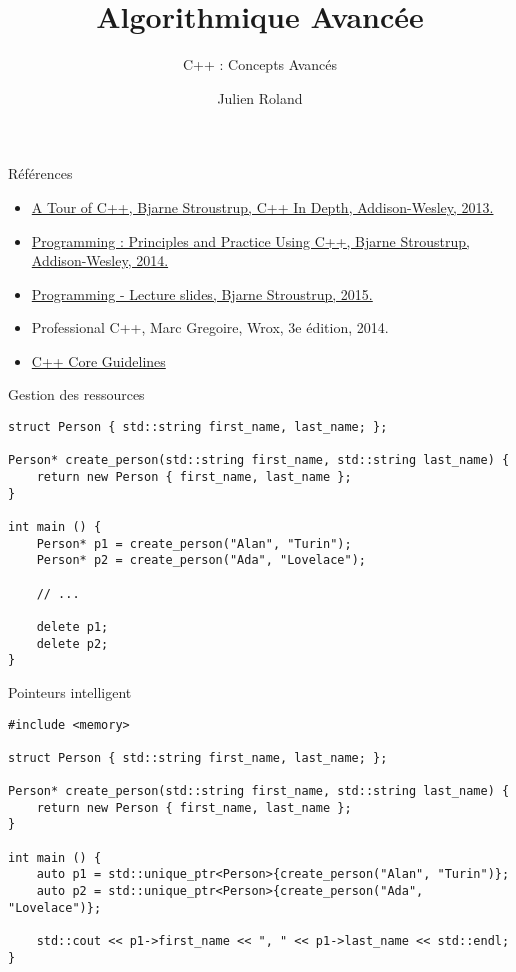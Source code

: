 \documentclass[handout]{beamer}
\title{Algorithmique Avancée}
\subtitle{C++ : Concepts Avancés}
\author{Julien Roland}
\begin{document}
\lstset{language=c++, basicstyle=\small, columns=fullflexible, inputencoding=utf8/latin1}
    
    
\maketitle

\begin{frame}[t]{Références}
    \begin{itemize}
        \item \href{http://www.informit.com/store/tour-of-c-plus-plus-9780133549010}{A Tour of C++, Bjarne Stroustrup, C++ In Depth, Addison-Wesley, 2013.}
        \item \href{http://www.stroustrup.com/Programming/}{Programming : Principles and Practice Using C++, Bjarne Stroustrup, Addison-Wesley, 2014.}
        \item \href{http://www.stroustrup.com/Programming/lecture-slides.html}{Programming - Lecture slides, Bjarne Stroustrup, 2015.}
        \item Professional C++, Marc Gregoire, Wrox, 3e édition, 2014.
        \item \href{http://isocpp.github.io/CppCoreGuidelines/CppCoreGuidelines}{C++ Core Guidelines}
    \end{itemize}
\end{frame}

\begin{frame}[fragile]{Gestion des ressources}
\begin{lstlisting}
struct Person { std::string first_name, last_name; };

Person* create_person(std::string first_name, std::string last_name) {
    return new Person { first_name, last_name };
}

int main () {
    Person* p1 = create_person("Alan", "Turin");
    Person* p2 = create_person("Ada", "Lovelace");

    // ...

    delete p1;
    delete p2;
}
\end{lstlisting}
\end{frame}

\begin{frame}[fragile]{Pointeurs intelligent}
\begin{lstlisting}
#include <memory>

struct Person { std::string first_name, last_name; };

Person* create_person(std::string first_name, std::string last_name) {
    return new Person { first_name, last_name };
}

int main () {
    auto p1 = std::unique_ptr<Person>{create_person("Alan", "Turin")};
    auto p2 = std::unique_ptr<Person>{create_person("Ada", "Lovelace")};

    std::cout << p1->first_name << ", " << p1->last_name << std::endl;
}
\end{lstlisting}
\end{frame}
\end{document}
